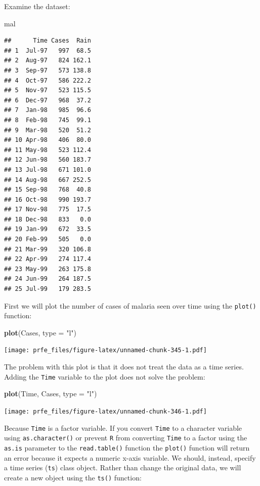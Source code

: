 \documentclass[12pt,a4paper]{book}
\newenvironment{Shaded}{\begin{snugshade}}{\end{snugshade}}
\newcommand{\DataTypeTok}[1]{\textcolor[rgb]{0.13,0.29,0.53}{#1}}
\newcommand{\KeywordTok}[1]{\textcolor[rgb]{0.13,0.29,0.53}{\textbf{#1}}}
\newcommand{\NormalTok}[1]{#1}
\newcommand{\StringTok}[1]{\textcolor[rgb]{0.31,0.60,0.02}{#1}}
\theoremstyle{definition}
\theoremstyle{definition}
\theoremstyle{definition}
\theoremstyle{remark}
\begin{document}
Examine the dataset:

\begin{Shaded}
\begin{Highlighting}[]
\NormalTok{mal}
\end{Highlighting}
\end{Shaded}

\begin{verbatim}
##      Time Cases  Rain
## 1  Jul-97   997  68.5
## 2  Aug-97   824 162.1
## 3  Sep-97   573 138.8
## 4  Oct-97   586 222.2
## 5  Nov-97   523 115.5
## 6  Dec-97   968  37.2
## 7  Jan-98   985  96.6
## 8  Feb-98   745  99.1
## 9  Mar-98   520  51.2
## 10 Apr-98   406  80.0
## 11 May-98   523 112.4
## 12 Jun-98   560 183.7
## 13 Jul-98   671 101.0
## 14 Aug-98   667 252.5
## 15 Sep-98   768  40.8
## 16 Oct-98   990 193.7
## 17 Nov-98   775  17.5
## 18 Dec-98   833   0.0
## 19 Jan-99   672  33.5
## 20 Feb-99   505   0.0
## 21 Mar-99   320 106.8
## 22 Apr-99   274 117.4
## 23 May-99   263 175.8
## 24 Jun-99   264 187.5
## 25 Jul-99   179 283.5
\end{verbatim}

First we will plot the number of cases of malaria seen over time using
the \texttt{plot()} function:

\begin{Shaded}
\begin{Highlighting}[]
\KeywordTok{plot}\NormalTok{(Cases, }\DataTypeTok{type =} \StringTok{"l"}\NormalTok{)}
\end{Highlighting}
\end{Shaded}

\texttt{[image: prfe\_files/figure-latex/unnamed-chunk-345-1.pdf]}

The problem with this plot is that it does not treat the data as a time
series. Adding the \texttt{Time} variable to the plot does not solve the
problem:

\begin{Shaded}
\begin{Highlighting}[]
\KeywordTok{plot}\NormalTok{(Time, Cases, }\DataTypeTok{type =} \StringTok{"l"}\NormalTok{)}
\end{Highlighting}
\end{Shaded}

\texttt{[image: prfe\_files/figure-latex/unnamed-chunk-346-1.pdf]}

Because \texttt{Time} is a factor variable. If you convert \texttt{Time}
to a character variable using \texttt{as.character()} or prevent
\texttt{R} from converting \texttt{Time} to a factor using the
\texttt{as.is} parameter to the \texttt{read.table()} function the
\texttt{plot()} function will return an error because it expects a
numeric x-axis variable. We should, instead, specify a time series
(\texttt{ts}) class object. Rather than change the original data, we
will create a new object using the \texttt{ts()} function:
\end{document}
